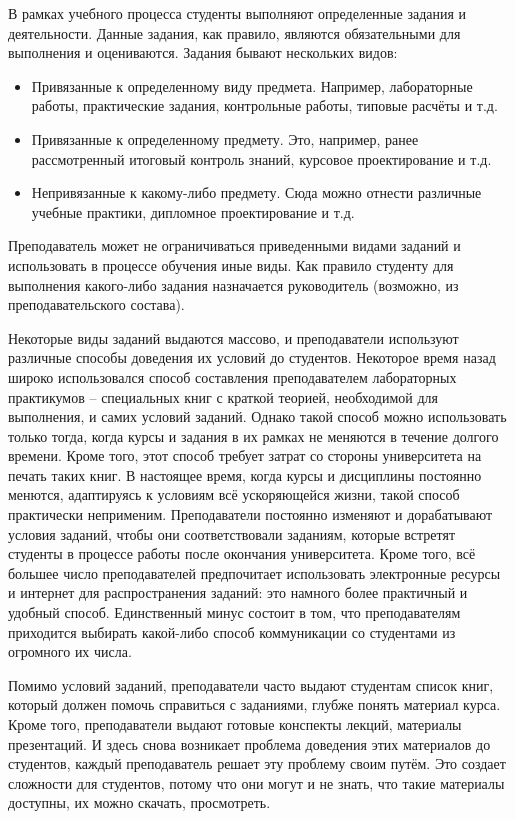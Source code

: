 В рамках учебного процесса студенты выполняют определенные задания и деятельности. Данные задания, как правило, являются обязательными для выполнения и оцениваются. Задания бывают нескольких видов:
\begin{itemize}
	\item Привязанные к определенному виду предмета. Например, лабораторные работы, практические задания, контрольные работы, типовые расчёты и т.д. 
	\item Привязанные к определенному предмету. Это, например, ранее рассмотренный итоговый контроль знаний, курсовое проектирование и т.д.
	\item Непривязанные к какому-либо предмету. Сюда можно отнести различные учебные практики, дипломное проектирование и т.д.
\end{itemize}

Преподаватель может не ограничиваться приведенными видами заданий и использовать в процессе обучения иные виды. Как правило студенту для выполнения какого-либо задания назначается руководитель (возможно, из преподавательского состава).

Некоторые виды заданий выдаются массово, и преподаватели используют различные способы доведения их условий до студентов. Некоторое время назад широко использовался способ составления преподавателем лабораторных практикумов -- специальных книг с краткой теорией, необходимой для выполнения, и самих условий заданий. Однако такой способ можно использовать только тогда, когда курсы и задания в их рамках не меняются в течение долгого времени. Кроме того, этот способ требует затрат со стороны университета на печать таких книг. В настоящее время, когда курсы и дисциплины постоянно менются, адаптируясь к условиям всё ускоряющейся жизни, такой способ практически неприменим. Преподаватели постоянно изменяют и дорабатывают условия заданий, чтобы они соответствовали заданиям, которые встретят студенты в процессе работы после окончания университета. Кроме того, всё большее число преподавателей предпочитает использовать электронные ресурсы и интернет для распространения заданий: это намного более практичный и удобный способ. Единственный минус состоит в том, что преподавателям приходится выбирать какой-либо способ коммуникации со студентами из огромного их числа.

Помимо условий заданий, преподаватели часто выдают студентам список книг, который должен помочь справиться с заданиями, глубже понять материал курса. Кроме того, преподаватели выдают готовые конспекты лекций, материалы презентаций. И здесь снова возникает проблема доведения этих материалов до студентов, каждый преподаватель решает эту проблему своим путём. Это создает сложности для студентов, потому что они могут и не знать, что такие материалы доступны, их можно скачать, просмотреть.


